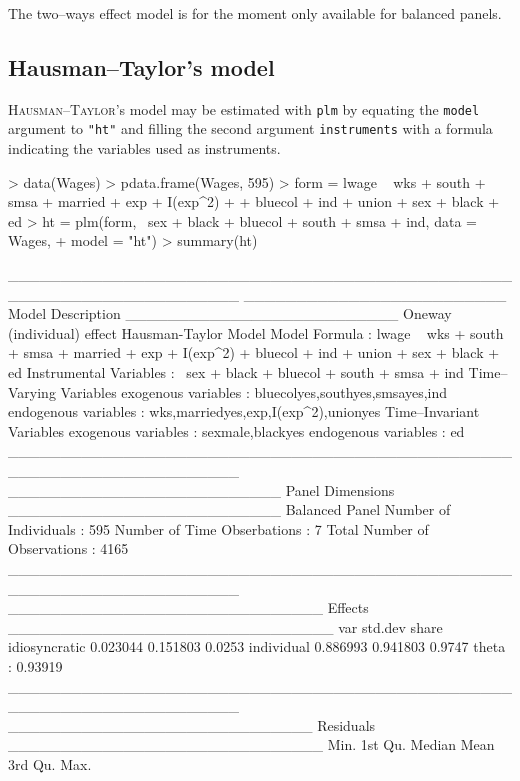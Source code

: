 \documentclass{article}
\begin{document}
The two--ways effect model is for the moment only available for
balanced panels.


\subsection{Hausman--Taylor's model}

\textsc{Hausman}--\textsc{Taylor}'s model may be estimated with \texttt{plm}
by equating the \texttt{model} argument to  \texttt{"ht"} and
filling the second argument \texttt{instruments} with a formula
indicating the variables used as instruments.


\begin{Schunk}
\begin{Sinput}
> data(Wages)
> pdata.frame(Wages, 595)
> form = lwage ~ wks + south + smsa + married + exp + I(exp^2) + 
+     bluecol + ind + union + sex + black + ed
> ht = plm(form, ~sex + black + bluecol + south + smsa + ind, data = Wages, 
+     model = "ht")
> summary(ht)
\end{Sinput}
\begin{Soutput}
______________________________________________________________________ 
_________________________ Model Description __________________________
Oneway (individual) effect
Hausman-Taylor Model
Model Formula             : lwage ~ wks + south + smsa + married + 
                                exp + I(exp^2) + bluecol + ind + 
                                union + sex + black + ed
Instrumental Variables    : ~sex + black + bluecol + south + 
                                smsa + ind
Time--Varying Variables    
    exogenous variables   :  bluecolyes,southyes,smsayes,ind 
    endogenous variables  :  wks,marriedyes,exp,I(exp^2),unionyes 
Time--Invariant Variables  
    exogenous variables   :  sexmale,blackyes 
    endogenous variables  :  ed 
______________________________________________________________________ 
__________________________ Panel Dimensions __________________________
Balanced Panel
Number of Individuals        :  595
Number of Time Obserbations  :  7
Total Number of Observations :  4165
______________________________________________________________________ 
______________________________ Effects _______________________________
                   var  std.dev  share
idiosyncratic 0.023044 0.151803 0.0253
individual    0.886993 0.941803 0.9747
theta   :  0.93919  
______________________________________________________________________ 
_____________________________ Residuals ______________________________
     Min.   1st Qu.    Median      Mean   3rd Qu.      Max. 

\end{Soutput}
\end{Schunk}
\end{document}

